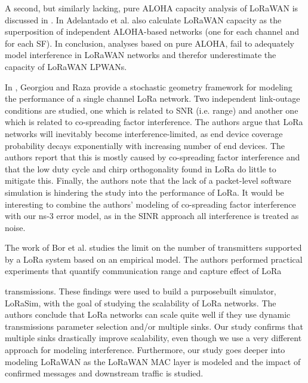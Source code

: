 A second,
	but similarly lacking,
	pure ALOHA capacity analysis of LoRaWAN is discussed in \cite{augustin_study_2016}.
In \cite{adelantado_understanding_2017} Adelantado et al.
also calculate LoRaWAN capacity as the superposition of independent ALOHA-based networks (one for each channel and for each SF).
In conclusion,
	analyses based on pure ALOHA,
	fail to adequately model interference in LoRaWAN networks and therefor underestimate the capacity of LoRaWAN LPWANs.

In \cite{georgiou_low_2017},
	Georgiou and Raza provide a stochastic geometry framework for modeling the performance of a single channel LoRa network.
Two independent link-outage conditions are studied,
	one which is related to SNR (i.e.
range) and another one which is related to co-spreading factor interference.
The authors argue that LoRa networks will inevitably become interference-limited,
	as end device coverage probability decays exponentially with increasing number of end devices.
The authors report that this is mostly caused by co-spreading factor interference and that the low duty cycle and chirp orthogonality found in LoRa do little to mitigate this.
Finally,
	the authors note that the lack of a packet-level software simulation is hindering the study into the performance of LoRa.
It would be interesting to combine the authors’ modeling of co-spreading factor interference with our ns-3 error model,
	as in the SINR approach all interference is treated as noise.

The work of Bor et al.
\cite{bor_lora_2016} studies the limit on the number of transmitters supported by a LoRa system based on an empirical model.
The authors performed practical experiments that quantify communication range and capture effect of LoRa

transmissions.
These findings were used to build a purposebuilt simulator,
	LoRaSim,
	with the goal of studying the scalability of LoRa networks.
The authors conclude that LoRa networks can scale quite well if they use dynamic transmissions parameter selection and/or multiple sinks.
Our study confirms that multiple sinks drastically improve scalability,
	even though we use a very different approach for modeling interference.
Furthermore,
	our study goes deeper into modeling LoRaWAN as the LoRaWAN MAC layer is modeled and the impact of confirmed messages and downstream traffic is studied.

